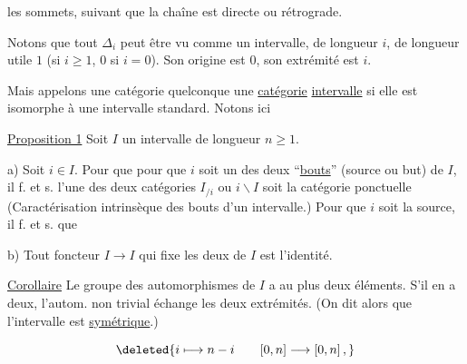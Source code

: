 
les sommets, suivant que la chaîne est directe ou rétrograde.

Notons que tout  $\mathbb{\Delta}_i$ peut être vu comme un intervalle, de longueur $i$, de longueur utile $1$ (si $i\geq1$, $0$ si $i=0$). Son origine est $0$, son extrémité est $i$.

Mais appelons une catégorie quelconque une  \uline{catégorie} \uline{intervalle} si elle est isomorphe à une  intervalle standard. Notons ici

\uline{Proposition 1} Soit $I$ un intervalle  de longueur $n\geq1$. 

a)  Soit $i\in I$. Pour que   pour que $i$ soit un des deux ``\uline{bouts}''  (source ou but) de $I$, il f. et s.  l'une des deux catégories $I_{/i}$ ou $i\backslash I$ soit  la catégorie ponctuelle  (Caractérisation intrinsèque des bouts d'un intervalle.) Pour que $i$ soit la source, il f. et s. que 


b) Tout foncteur $I\longrightarrow I$ qui fixe les deux  de $I$ est l'identité.


\uline{Corollaire} Le groupe des automorphismes de $I$ a au plus deux éléments. S'il en a deux, l'autom. non trivial échange les deux extrémités. (On dit  alors que l'intervalle est \uline{symétrique}.) 


\[\deleted{i\longmapsto n-i\qquad [0,n]\longrightarrow[0,n]\,,}\]

